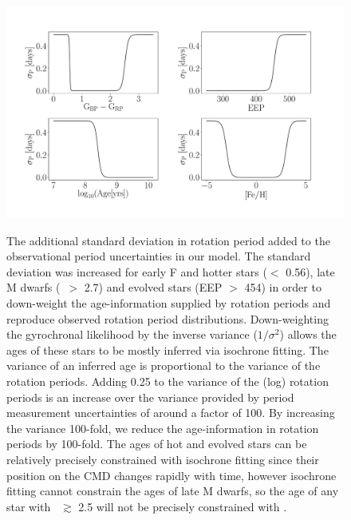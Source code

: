\begin{figure}
  \caption{
    The additional standard deviation in rotation period added to the
    observational period uncertainties in our model.
    The standard deviation was increased for early F and hotter
    stars (\gcolor $<$ 0.56), late M dwarfs (\gcolor\ $>$ 2.7) and evolved
    stars (EEP $>$ 454) in order to down-weight the age-information supplied
    by rotation periods and reproduce observed rotation period distributions.
    Down-weighting the gyrochronal likelihood by the inverse variance
    ($1/\sigma^2$) allows the ages of these stars to be mostly inferred
    via isochrone fitting.
    The variance of an inferred age is proportional to the
    variance of the rotation periods.
    Adding 0.25 to the variance of the (log) rotation periods is an increase
    over the variance provided by period measurement uncertainties of around
    a factor of 100.
    By increasing the variance 100-fold, we reduce the age-information in
    rotation periods by 100-fold.
    The ages of hot and evolved stars can be relatively precisely constrained
    with isochrone fitting since their position on the CMD changes rapidly
    with time, however isochrone fitting cannot constrain the ages of
    late M dwarfs, so the age of any star with \gcolor\ $\gtrsim$ 2.5 will not
    be precisely constrained with \sd.
}
  \centering
    \includegraphics[width=1.\textwidth]{variance}
\label{fig:variance}
\end{figure}

